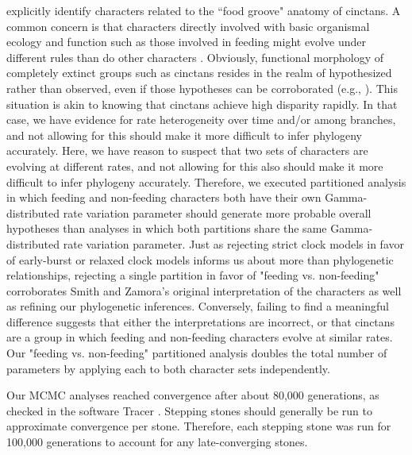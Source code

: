 \documentclass{article}
\begin{document}
\citet{SmithZamora2009} explicitly identify characters related to the ``food groove" anatomy of cinctans. A common concern is that characters directly involved with basic organismal ecology and function such as those involved in feeding might evolve under different rules than do other characters \citep{Foote1994,Foote1996a,Wagner1995,Sanchez-Villagra1998,Ciampaglio2002,HopkinsSmith2015, Wright2017}. Obviously, functional morphology of completely extinct groups such as cinctans resides in the realm of hypothesized rather than observed, even if those hypotheses can be corroborated (e.g., \citealp{RahmanEtAl2020}). This situation is akin to knowing that cinctans achieve high disparity rapidly. In that case, we have evidence for rate heterogeneity over time and/or among branches, and not allowing for this should make it more difficult to infer phylogeny accurately. Here, we have reason to suspect that two sets of characters are evolving at different rates, and not allowing for this also should make it more difficult to infer phylogeny accurately. Therefore, we executed partitioned analysis in which feeding and non-feeding characters both have their own Gamma-distributed rate variation parameter should generate more probable overall hypotheses than analyses in which both partitions share the same Gamma-distributed rate variation parameter. Just as rejecting strict clock models in favor of early-burst or relaxed clock models informs us about more than phylogenetic relationships, rejecting a single partition in favor of "feeding vs. non-feeding" corroborates Smith and Zamora's original interpretation of the characters as well as refining our phylogenetic inferences. Conversely, failing to find a meaningful difference suggests that either the interpretations are incorrect, or that cinctans are a group in which feeding and non-feeding characters evolve at similar rates. Our "feeding vs. non-feeding" partitioned analysis doubles the total number of parameters by applying each to both character sets independently.

Our MCMC analyses reached convergence after about 80,000 generations, as checked in the software Tracer \citep{Rambaut2018}. 
Stepping stones should generally be run to approximate convergence per stone.
Therefore, each stepping stone was run for 100,000 generations to account for any late-converging stones.
\end{document}
